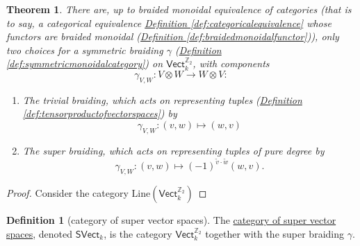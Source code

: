 \documentclass[a4paper]{report}
\newcommand{\Z}{\mathbb{Z}}
\newcommand{\defn}[1]{\ul{#1}}
\newcommand{\Line}{\mathrm{Line}}
\theoremstyle{definition}
\newtheorem{definition}{Definition}[section]
\theoremstyle{plain}
\newtheorem{theorem}{Theorem}[section]
\theoremstyle{remark}
\begin{document}
\begin{theorem}
  There are, up to braided monoidal equivalence of categories (that is to say, a categorical equivalence \hyperref[def:categoricalequivalence]{Definition \ref*{def:categoricalequivalence}} whose functors are braided monoidal (\hyperref[def:braidedmonoidalfunctor]{Definition \ref*{def:braidedmonoidalfunctor}})), only two choices for a symmetric braiding $\gamma$ (\hyperref[def:symmetricmonoidalcategory]{Definition \ref*{def:symmetricmonoidalcategory}}) on $\mathsf{Vect}_{k}^{\Z_{2}}$, with components
  \begin{equation*}
    \gamma_{V,W}\colon V \otimes W \to W \otimes V:
  \end{equation*}

  \begin{enumerate}
    \item The \emph{trivial braiding}, which acts on representing tuples (\hyperref[def:tensorproductofvectorspaces]{Definition \ref*{def:tensorproductofvectorspaces}}) by 
      \begin{equation*}
        \gamma_{V, W}\colon (v, w) \mapsto (w, v)
      \end{equation*}

    \item The \emph{super braiding}, which acts on representing tuples of pure degree by
      \begin{equation*}
        \gamma_{V, W}\colon (v, w) \mapsto (-1)^{\tilde{v}\cdot \tilde{w}}(w, v).
      \end{equation*}
  \end{enumerate}
\end{theorem}

\begin{proof}
  Consider the category $\Line(\mathsf{Vect}_{k}^{\Z_{2}})$
\end{proof}

\begin{definition}[category of super vector spaces]
  \label{def:categoryofsupervectorspaces}
  The \defn{category of super vector spaces}, denoted $\mathsf{SVect}_{k}$, is the category $\mathsf{Vect}_{k}^{\Z_{2}}$ together with the super braiding $\gamma$.
\end{definition}
\end{document}
